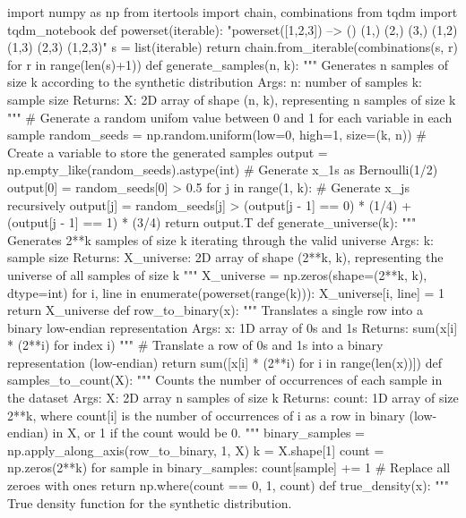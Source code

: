 \begin{python}
import numpy as np
from itertools import chain, combinations
from tqdm import tqdm_notebook
def powerset(iterable):
    "powerset([1,2,3]) --> () (1,) (2,) (3,) (1,2) (1,3) (2,3) (1,2,3)"
    s = list(iterable)
    return chain.from_iterable(combinations(s, r) for r in range(len(s)+1))
def generate_samples(n, k):
    """
    Generates n samples of size k according to the synthetic distribution
    Args:
       n:  number of samples
       k:  sample size
    Returns:
       X:  2D array of shape (n, k), 
           representing n samples of size k
    """
    # Generate a random unifom value between 0 and 1 for each variable in each sample
    random_seeds = np.random.uniform(low=0, high=1, size=(k, n))
    # Create a variable to store the generated samples
    output = np.empty_like(random_seeds).astype(int)
    # Generate x_{1}s as Bernoulli(1/2)
    output[0] = random_seeds[0] > 0.5
    for j in range(1, k):
        # Generate x_{j}s recursively
        output[j] = random_seeds[j] > (output[j - 1] == 0) * (1/4) 
                                      + (output[j - 1] == 1) * (3/4)
    return output.T
def generate_universe(k):
    """
    Generates 2**k samples of size k iterating through the valid universe
    Args:
       k: sample size
    Returns:
       X_universe:  2D array of shape (2**k, k), 
                    representing the universe of all samples of size k
    """
    X_universe = np.zeros(shape=(2**k, k), dtype=int)
    for i, line in enumerate(powerset(range(k))):
        X_universe[i, line] = 1
    return X_universe
def row_to_binary(x):
    """
    Translates a single row into a binary low-endian representation
    Args:
       x:  1D array of 0s and 1s
    Returns:
       sum(x[i] * (2**i) for index i)
    """
    # Translate a row of 0s and 1s into a binary representation (low-endian)
    return sum([x[i] * (2**i) for i in range(len(x))])
def samples_to_count(X):
    """
    Counts the number of occurrences of each sample in the dataset
    Args:
       X:   2D array  n samples of size k
    Returns:
       count:  1D array of size 2**k, where count[i] is the number of
               occurrences of i as a row in binary (low-endian) in X,
               or 1 if the count would be 0.
    """
    binary_samples = np.apply_along_axis(row_to_binary, 1, X)
    k = X.shape[1]
    count = np.zeros(2**k)
    for sample in binary_samples:
        count[sample] += 1
    # Replace all zeroes with ones
    return np.where(count == 0, 1, count)
def true_density(x):
    """
    True density function for the synthetic distribution.

\end{python}
